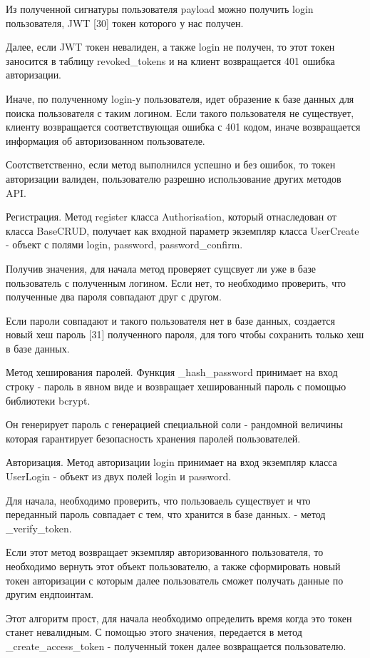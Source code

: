 \documentclass[a4paper,14pt,oneside]{extreport}
\begin{document}
Из полученной сигнатуры пользователя payload можно получить login пользователя, JWT [30] токен которого у нас получен.

Далее, если JWT токен невалиден, а также login не получен, то этот токен заносится в таблицу revoked\_tokens и на клиент возвращается 401 ошибка авторизации.

Иначе, по полученному login-у пользователя, идет образение к базе данных для поиска пользователя с таким логином. Если такого пользователя не существует, клиенту возвращается соответствующая ошибка с 401 кодом, иначе возвращается информация об авторизованном пользователе.

Соотстветственно, если метод выполнился успешно и без ошибок, то токен авторизации валиден, пользователю разрешно использование других методов API.

Регистрация. Метод register класса Authorisation, который отнаследован от класса BaseCRUD, получает как входной параметр экземпляр класса UserCreate - объект с полями login, password, password\_confirm.

Получив значения, для начала метод проверяет сущсвует ли уже в базе пользователь с полученным логином. Если нет, то необходимо проверить, что полученные два пароля совпадают друг с другом.

Если пароли совпадают и такого пользователя нет в базе данных, создается новый хеш пароль [31] полученного пароля, для того чтобы сохранить только хеш в базе данных. 

Метод хеширования паролей. Функция \_hash\_password принимает на вход строку - пароль в явном виде и возвращает хешированный пароль с помощью библиотеки bcrypt.

Он генерирует пароль с генерацией специальной соли - рандомной величины которая гарантирует безопасность хранения паролей пользователей.

Авторизация. Метод авторизации login принимает на вход экземпляр класса UserLogin - объект из двух полей login и password.


Для начала, необходимо проверить, что пользоваель существует и что переданный пароль совпадает с тем, что хранится в базе данных. - метод \_verify\_token.

Если этот метод возвращает экземпляр авторизованного пользователя, то необходимо вернуть этот объект пользователю, а также сформировать новый токен авторизации с которым далее пользователь сможет получать данные по другим ендпоинтам.

Этот алгоритм прост, для начала необходимо определить время когда это токен станет невалидным. С помощью этого значения, передается в метод \_create\_access\_token - полученный токен далее возвращается пользователю.
\end{document}
